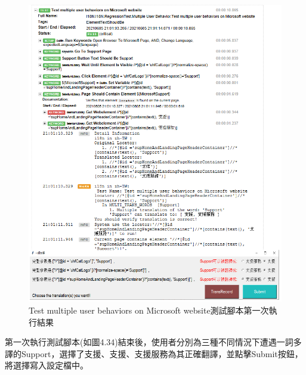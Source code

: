 \begin{figure}[H]
\includegraphics[width= \textwidth]{../論文截圖/4-4-2 test multiple user behaviors測試腳本1st run.png}
\caption{Test multiple user behaviors on Microsoft website測試腳本第一次執行結果}
\end{figure}

第一次執行測試腳本(如圖4.34)結束後，使用者分別為三種不同情況下遭遇一詞多譯的Support，選擇了支援、支援、支援服務為其正確翻譯，並點擊Submit按鈕，將選擇寫入設定檔中。

